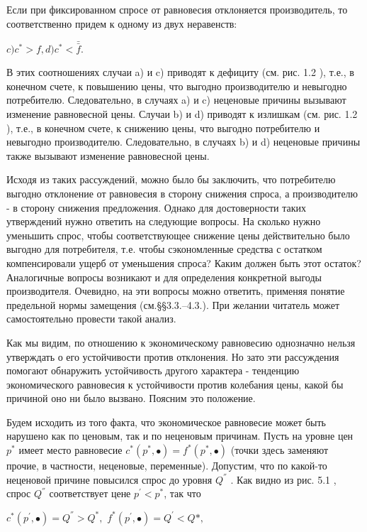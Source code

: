 \documentclass[12pt, 4paper]{book}
\begin{document}
{Если при фиксированном спросе от равновесия отклоняется производитель, то соответственно придем к одному из двух неравенств:
\par

\begin{center}
$c) c^{*} > f, d) c^{*} < \bar{\bar{f}}.$
\end{center}
\par

В этих соотношениях случаи a) и c) приводят к дефициту (см. рис. 1.2 ), т.е., в конечном счете, к повышению цены, что выгодно производителю и невыгодно потребителю. Следовательно, в случаях a) и c) неценовые причины вызывают изменение равновесной цены. Случаи b) и d) приводят к излишкам (см. рис. 1.2 ), т.е., в конечном счете, к снижению цены, что выгодно потребителю и невыгодно производителю. Следовательно, в случаях b) и d) неценовые причины также вызывают изменение равновесной цены.
\par

Исходя из таких рассуждений, можно было бы заключить, что потребителю выгодно отклонение от равновесия в сторону снижения спроса, а производителю - в сторону снижения предложения. Однако для достоверности таких утверждений нужно ответить на следующие вопросы. На сколько нужно уменьшить спрос, чтобы соответствующее снижение цены действительно было выгодно для потребителя, т.е. чтобы сэкономленные средства с остатком компенсировали ущерб от уменьшения спроса? Каким должен быть этот остаток? Аналогичные вопросы возникают и для определения конкретной выгоды производителя. Очевидно, на эти вопросы можно ответить, применяя понятие предельной нормы замещения (см.§§3.3.–4.3.). При желании читатель может самостоятельно провести такой анализ.
\par

Как мы видим, по отношению к экономическому равновесию однозначно нельзя утверждать о его устойчивости против отклонения. Но зато эти рассуждения помогают обнаружить устойчивость другого характера - тенденцию экономического равновесия к устойчивости против колебания цены, какой бы причиной оно ни было вызвано. Поясним это положение.
\par

Будем исходить из того факта, что экономическое равновесие может быть нарушено как по ценовым, так и по неценовым причинам. Пусть на уровне цен $p^{*}$ имеет место равновесие $c^{*}(p^{*},\bullet)=f^{*}(p^{*},\bullet)$ (точки здесь заменяют прочие, в частности, неценовые, переменные). Допустим, что по какой-то неценовой причине повысился спрос до уровня $Q^{''}$ . Как видно из рис. 5.1 , спрос $Q^{''}$ соответствует цене $p^{'}<p^{*}$, так что
\begin{center}
$c^{*}(p^{'},\bullet)=Q^{''} > Q^{*},$
$f^{*}(p^{'},\bullet)=Q^{'}<Q{*},$
\end{center}
\par

}
\end{document}
